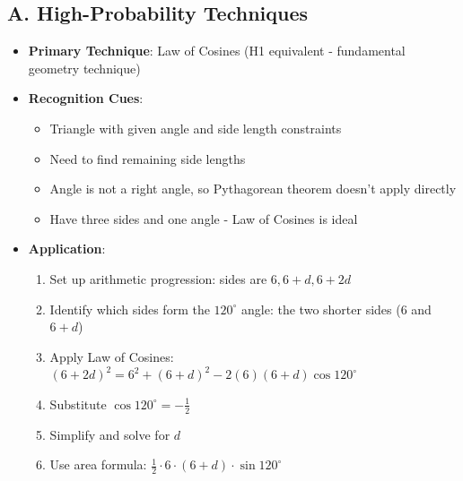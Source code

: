 \documentclass[12pt]{article}
\begin{document}
\begin{techniquesbox}
\subsection*{A. High-Probability Techniques}
\begin{itemize}[leftmargin=*]
    \item \textbf{Primary Technique}: Law of Cosines (H1 equivalent - fundamental geometry technique)
    \item \textbf{Recognition Cues}: 
    \begin{itemize}
        \item Triangle with given angle and side length constraints
        \item Need to find remaining side lengths
        \item Angle is not a right angle, so Pythagorean theorem doesn't apply directly
        \item Have three sides and one angle - Law of Cosines is ideal
    \end{itemize}
    \item \textbf{Application}: 
    \begin{enumerate}
        \item Set up arithmetic progression: sides are $6, 6+d, 6+2d$
        \item Identify which sides form the $120^\circ$ angle: the two shorter sides (6 and $6+d$)
        \item Apply Law of Cosines: $(6+2d)^2 = 6^2 + (6+d)^2 - 2(6)(6+d)\cos 120^\circ$
        \item Substitute $\cos 120^\circ = -\frac{1}{2}$
        \item Simplify and solve for $d$
        \item Use area formula: $\frac{1}{2} \cdot 6 \cdot (6+d) \cdot \sin 120^\circ$
    \end{enumerate}
\end{itemize}


\end{techniquesbox}
\end{document}
